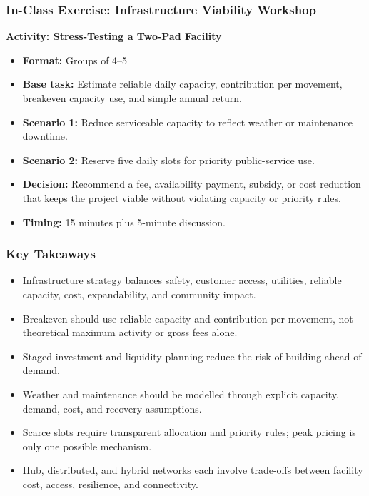 \documentclass{beamer}
\begin{document}
\begin{frame}[t]
\frametitle{In-Class Exercise: Infrastructure Viability Workshop}
\textbf{Activity: Stress-Testing a Two-Pad Facility}
\begin{itemize}
\item \textbf{Format:} Groups of 4--5
\item \textbf{Base task:} Estimate reliable daily capacity, contribution per movement, breakeven capacity use, and simple annual return.
\item \textbf{Scenario 1:} Reduce serviceable capacity to reflect weather or maintenance downtime.
\item \textbf{Scenario 2:} Reserve five daily slots for priority public-service use.
\item \textbf{Decision:} Recommend a fee, availability payment, subsidy, or cost reduction that keeps the project viable without violating capacity or priority rules.
\item \textbf{Timing:} 15 minutes plus 5-minute discussion.
\end{itemize}
\end{frame}

\begin{frame}[t]
\frametitle{Key Takeaways}
\begin{itemize}
\item Infrastructure strategy balances safety, customer access, utilities, reliable capacity, cost, expandability, and community impact.
\item Breakeven should use reliable capacity and contribution per movement, not theoretical maximum activity or gross fees alone.
\item Staged investment and liquidity planning reduce the risk of building ahead of demand.
\item Weather and maintenance should be modelled through explicit capacity, demand, cost, and recovery assumptions.
\item Scarce slots require transparent allocation and priority rules; peak pricing is only one possible mechanism.
\item Hub, distributed, and hybrid networks each involve trade-offs between facility cost, access, resilience, and connectivity.
\end{itemize}
\end{frame}
\end{document}
